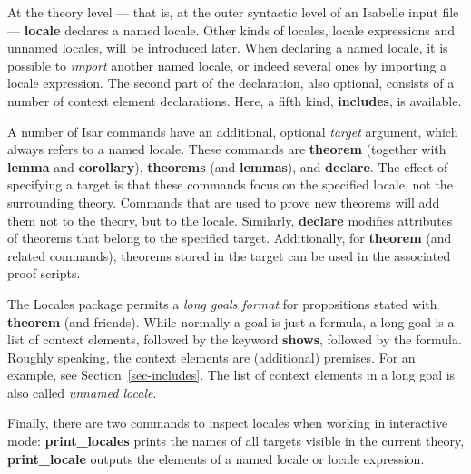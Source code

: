 \begin{isabellebody}
\begin{isamarkuptext}
  At the theory level --- that is, at the outer syntactic level of an
  Isabelle input file --- \textbf{locale} declares a named
  locale.  Other kinds of locales,
  locale expressions and unnamed locales, will be introduced later.  When
  declaring a named locale, it is possible to \emph{import} another
  named locale, or indeed several ones by importing a locale
  expression.  The second part of the declaration, also optional,
  consists of a number of context element declarations.  Here, a fifth
  kind, \textbf{includes}, is available.

  A number of Isar commands have an additional, optional \emph{target}
  argument, which always refers to a named locale.  These commands
  are \textbf{theorem} (together with \textbf{lemma} and
  \textbf{corollary}),  \textbf{theorems} (and
  \textbf{lemmas}), and \textbf{declare}.  The effect of specifying a target is
  that these commands focus on the specified locale, not the
  surrounding theory.  Commands that are used to
  prove new theorems will add them not to the theory, but to the
  locale.  Similarly, \textbf{declare} modifies attributes of theorems
  that belong to the specified target.  Additionally, for
  \textbf{theorem} (and related commands), theorems stored in the target
  can be used in the associated proof scripts.

  The Locales package permits a \emph{long goals format} for
  propositions stated with \textbf{theorem} (and friends).  While
  normally a goal is just a formula, a long goal is a list of context
  elements, followed by the keyword \textbf{shows}, followed by the
  formula.  Roughly speaking, the context elements are
  (additional) premises.  For an example, see
  Section~\ref{sec-includes}.  The list of context elements in a long goal
  is also called \emph{unnamed locale}.

  Finally, there are two commands to inspect locales when working in
  interactive mode: \textbf{print\_locales} prints the names of all
  targets
  visible in the current theory, \textbf{print\_locale} outputs the
  elements of a named locale or locale expression.


\end{isamarkuptext}
\end{isabellebody}
